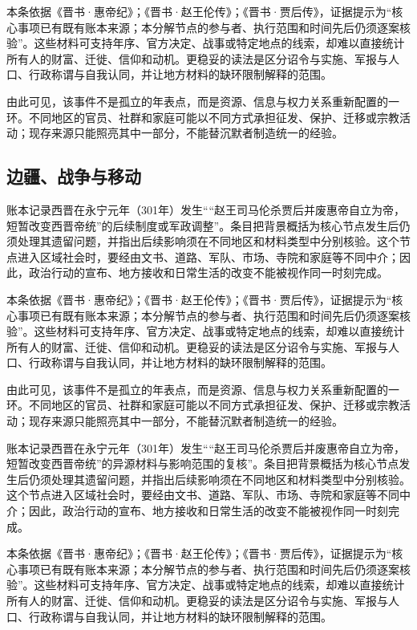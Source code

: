本条依据《晋书·惠帝纪》；《晋书·赵王伦传》；《晋书·贾后传》，证据提示为“核心事项已有既有账本来源；本分解节点的参与者、执行范围和时间先后仍须逐案核验”。这些材料可支持年序、官方决定、战事或特定地点的线索，却难以直接统计所有人的财富、迁徙、信仰和动机。更稳妥的读法是区分诏令与实施、军报与人口、行政称谓与自我认同，并让地方材料的缺环限制解释的范围。

由此可见，该事件不是孤立的年表点，而是资源、信息与权力关系重新配置的一环。不同地区的官员、社群和家庭可能以不同方式承担征发、保护、迁移或宗教活动；现存来源只能照亮其中一部分，不能替沉默者制造统一的经验。

\subsection{边疆、战争与移动}

账本记录西晋在永宁元年（301年）发生““赵王司马伦杀贾后并废惠帝自立为帝，短暂改变西晋帝统”的后续制度或军政调整”。条目把背景概括为核心节点发生后仍须处理其遗留问题，并指出后续影响须在不同地区和材料类型中分别核验。这个节点进入区域社会时，要经由文书、道路、军队、市场、寺院和家庭等不同中介；因此，政治行动的宣布、地方接收和日常生活的改变不能被视作同一时刻完成。

本条依据《晋书·惠帝纪》；《晋书·赵王伦传》；《晋书·贾后传》，证据提示为“核心事项已有既有账本来源；本分解节点的参与者、执行范围和时间先后仍须逐案核验”。这些材料可支持年序、官方决定、战事或特定地点的线索，却难以直接统计所有人的财富、迁徙、信仰和动机。更稳妥的读法是区分诏令与实施、军报与人口、行政称谓与自我认同，并让地方材料的缺环限制解释的范围。

由此可见，该事件不是孤立的年表点，而是资源、信息与权力关系重新配置的一环。不同地区的官员、社群和家庭可能以不同方式承担征发、保护、迁移或宗教活动；现存来源只能照亮其中一部分，不能替沉默者制造统一的经验。

账本记录西晋在永宁元年（301年）发生““赵王司马伦杀贾后并废惠帝自立为帝，短暂改变西晋帝统”的异源材料与影响范围的复核”。条目把背景概括为核心节点发生后仍须处理其遗留问题，并指出后续影响须在不同地区和材料类型中分别核验。这个节点进入区域社会时，要经由文书、道路、军队、市场、寺院和家庭等不同中介；因此，政治行动的宣布、地方接收和日常生活的改变不能被视作同一时刻完成。

本条依据《晋书·惠帝纪》；《晋书·赵王伦传》；《晋书·贾后传》，证据提示为“核心事项已有既有账本来源；本分解节点的参与者、执行范围和时间先后仍须逐案核验”。这些材料可支持年序、官方决定、战事或特定地点的线索，却难以直接统计所有人的财富、迁徙、信仰和动机。更稳妥的读法是区分诏令与实施、军报与人口、行政称谓与自我认同，并让地方材料的缺环限制解释的范围。

